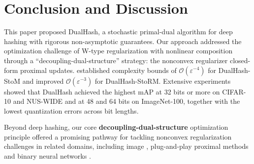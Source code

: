 \section{Conclusion and Discussion}
\label{Section: Conclusion}
This paper proposed DualHash, a stochastic primal-dual algorithm for deep hashing with rigorous non-asymptotic  guarantees. Our approach addressed the optimization challenge of W-type regularization with nonlinear composition through a ``decoupling-dual-structure'' strategy:  the nonconvex regularizer  closed-form proximal updates.  established complexity bounds of $\mathcal{O}(\varepsilon^{-4})$ for DualHash-StoM and improved $\mathcal{O}(\varepsilon^{-3})$ for DualHash-StoRM. Extensive experiments showed that DualHash achieved the highest mAP at 32 bits or more on CIFAR-10 and NUS-WIDE and at 48 and 64 bits on ImageNet-100, together with the lowest quantization errors across bit lengths. 

Beyond deep hashing, our core \textbf{decoupling-dual-structure} optimization principle offered a promising pathway for tackling nonconvex regularization challenges in related domains, including image  \cite{ding2020ldct_pfbs}, plug-and-play proximal methods \cite{JMLR:v23:20-1297} and binary neural networks \cite{bai2019proxquant}.